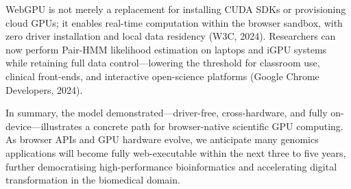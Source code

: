 \documentclass[PhD]{PHlab-thesis}
\begin{document}
WebGPU is not merely a replacement for installing CUDA SDKs or provisioning cloud GPUs; it enables real-time computation within the browser sandbox, with zero driver installation and local data residency (W3C, 2024). Researchers can now perform Pair-HMM likelihood estimation on laptops and iGPU systems while retaining full data control—lowering the threshold for classroom use, clinical front-ends, and interactive open-science platforms (Google Chrome Developers, 2024).

In summary, the model demonstrated—driver-free, cross-hardware, and fully on-device—illustrates a concrete path for browser-native scientific GPU computing. As browser APIs and GPU hardware evolve, we anticipate many genomics applications will become fully web-executable within the next three to five years, further democratising high-performance bioinformatics and accelerating digital transformation in the biomedical domain.
\end{document}
